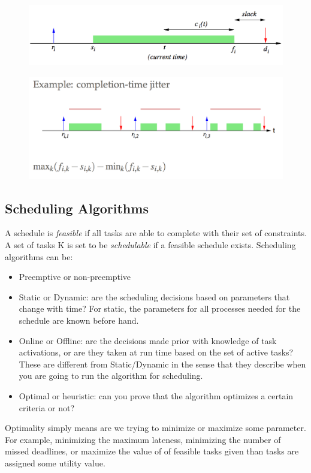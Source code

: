 \documentclass{hw}
\begin{document}
\begin{figure}[H]
  \centering
  \includegraphics[scale=.6]{img/schedule}
\end{figure}
\begin{figure}[H]
  \centering
  \includegraphics[scale=.6]{img/jitter}
\end{figure}

\subsection{Scheduling Algorithms}
A schedule is \emph{feasible} if all tasks are able to complete with
their set of constraints. A set of tasks K is set to be \emph{schedulable} if a 
feasible schedule exists. Scheduling algorithms can be:
\begin{itemize}
  \item Preemptive or non-preemptive
  \item Static or Dynamic: are the scheduling decisions based on parameters that
    change with time? For static, the parameters for all processes needed for the
    schedule are known before hand.
  \item Online or Offline: are the decisions made prior with knowledge of task 
    activations, or are they taken at run time based on the set of active tasks?
    These are different from Static/Dynamic in the sense that they describe when
    you are going to run the algorithm for scheduling. 
  \item Optimal or heuristic: can you prove that the algorithm optimizes a 
    certain criteria or not?
\end{itemize}
Optimality simply means are we trying to minimize or maximize some parameter. 
For example, minimizing the maximum lateness, minimizing the number of missed 
deadlines, or maximize the value of of feasible tasks given than tasks are 
assigned some utility value.
\end{document}
